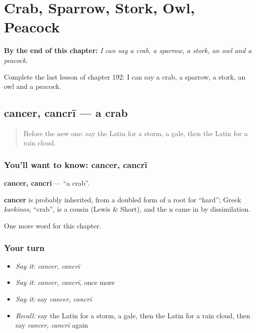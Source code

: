 
\chapter{Crab, Sparrow, Stork, Owl, Peacock}
\label{ch:la-crab-sparrow-stork-owl-peacock}

\begin{chapteropening}
\textbf{By the end of this chapter:} \emph{I can say a crab, a sparrow, a stork, an owl and a peacock.}

Complete the last lesson of chapter 192: I can say a crab, a sparrow, a stork, an owl and a peacock.
\end{chapteropening}

\section[cancer, cancrī]{cancer, cancrī — a crab}

\label{lesson:LA-C192-cancer}



\begin{quote}
Before the new one: say the Latin for a storm, a gale, then the Latin for a rain cloud.
\end{quote}

\subsection*{You'll want to know: cancer, cancrī}
\textbf{cancer, cancrī} — \textquotedblleft{}a crab\textquotedblright{}.

\begin{cousinweb}
\textbf{cancer} is probably inherited, from a doubled form of a root for \textquotedblleft{}hard\textquotedblright{}; Greek \emph{karkinos}, \textquotedblleft{}crab\textquotedblright{}, is a cousin (Lewis \& Short), and the n came in by dissimilation.
\end{cousinweb}

\begin{grammarlens}[title={What you've built}]
One more word for this chapter.
\end{grammarlens}

\subsection*{Your turn}
\begin{itemize}
\raggedright
  \item \emph{Say it:} \emph{cancer, cancrī}
  \item \emph{Say it:} \emph{cancer, cancrī}, once more
  \item \emph{Say it:} say \emph{cancer, cancrī}
  \item \emph{Recall:} say the Latin for a storm, a gale, then the Latin for a rain cloud, then say \emph{cancer, cancrī} again
\end{itemize}

